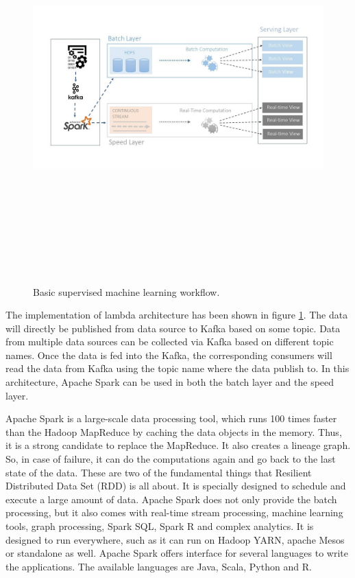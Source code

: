 \begin{figure}[htpb]
	\centering
	\includegraphics[width=17cm,height=15cm,keepaspectratio=true]{images/imp_lambda_arc}
	\caption{
		Basic supervised machine learning workflow.
	}
	\label{fig:impl_lambda_arc}
\end{figure}


The implementation of lambda architecture has been shown in figure \ref{fig:impl_lambda_arc}. The data will directly be published from data source to Kafka based on some topic. Data from multiple data sources can be collected via Kafka based on different topic names. Once the data is fed into the Kafka, the corresponding consumers will read the data from Kafka using the topic name where the data publish to. In this architecture, Apache Spark can be used in both the batch layer and the speed layer. 

Apache Spark is a large-scale data processing tool, which runs 100 times faster than the Hadoop MapReduce by caching the data objects in the memory. Thus, it is a strong candidate to replace the MapReduce. It also creates a lineage graph. So, in case of failure, it can do the computations again and go back to the last state of the data. These are two of the fundamental things that Resilient Distributed Data Set (RDD) is all about. It is specially designed to schedule and execute a large amount of data. Apache Spark does not only provide the batch processing, but it also comes with real-time stream processing, machine learning tools, graph processing, Spark SQL, Spark R and complex analytics. It is designed to run everywhere, such as it can run on Hadoop YARN, apache Mesos or standalone as well. Apache Spark offers interface for several languages to write the applications. The available languages are Java, Scala, Python and R.
